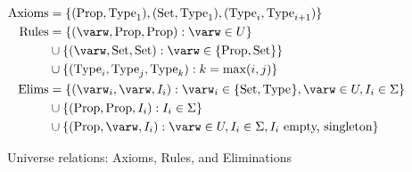 \begin{figure}
\centering
\begin{align*}
\text{Axioms}
    &= \set{(\Prop, \Type{1}), (\Set, \Type{1}), (\Type{i}, \Type{i+1})} \\
\text{Rules}
    &= \set{(\varw, \Prop, \Prop) : \varw \in U} \\
    &\cup \set{(\varw, \Set, \Set) : \varw \in \set{\Prop, \Set}} \\
    &\cup \set{(\Type{i}, \Type{j}, \Type{k}) : k = \max(i, j)} \\
\text{Elims}
    &= \set{(\varw_i, \varw, I_i) : \varw_i \in \set{\Set, \Type{}}, \varw \in U, I_i \in \Sigma} \\
    &\cup \set{(\Prop, \Prop, I_i) : I_i \in \Sigma} \\
    &\cup \set{(\Prop, \varw, I_i) : \varw \in U, I_i \in \Sigma, \text{$I_i$ empty, singleton}}
\end{align*}
\caption{Universe relations: Axioms, Rules, and Eliminations}
\label{fig:axruel}
\end{figure}